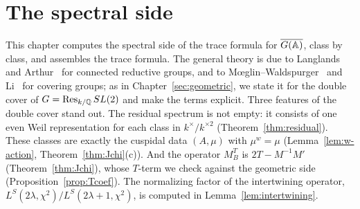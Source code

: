 %
%

\providecommand{\GA}{\overline{G(\A)}}

\chapter{The spectral side}\label{sec:spectral}

This chapter computes the spectral side of the trace formula for $\GA$,
class by class, and assembles the trace formula. The general theory is
due to Langlands~\cite{La76} and Arthur~\cite{Ar80,Ar82} for connected
reductive groups, and to M\oe glin--Waldspurger~\cite{MW95} and
Li~\cite{Li13} for covering groups; as in Chapter~\ref{sec:geometric},
we state it for the double cover of $G=\operatorname{Res}_{k/\mathbb{Q}}SL(2)$ and make the
terms explicit. Three features of the double cover stand out. The
residual spectrum is not empty: it consists of one even Weil
representation for each class in $k^\times/k^{\times2}$
(Theorem~\ref{thm:residual}). These classes are exactly the cuspidal
data $(A,\mu)$ with $\mu^w=\mu$
(Lemma~\ref{lem:w-action}, Theorem~\ref{thm:Jchi}(c)). And the operator
$M_B^T$ is $2T-M^{-1}M'$ (Theorem~\ref{thm:Jchi}), whose $T$-term we check
against the geometric side (Proposition~\ref{prop:Tcoef}). The
normalizing factor of the intertwining operator, $L^S(2\lambda,\chi^2)/
L^S(2\lambda+1,\chi^2)$, is computed in Lemma~\ref{lem:intertwining}.

